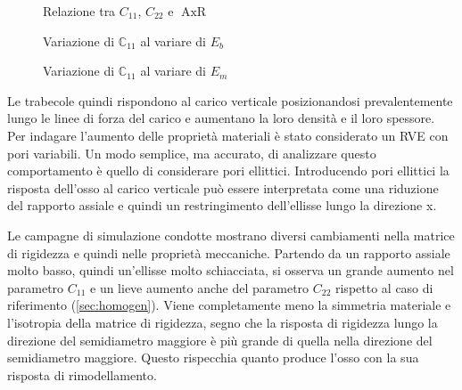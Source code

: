 \documentclass[a4paper,num-refs]{oup-contemporary}
\begin{document}
\label{sec:variazione_simmetria}

\begin{figure}[bt!] %

	\centering
	\def\svgwidth{0.9\linewidth}
	
	\caption{Relazione tra $C_{11}$, $C_{22}$ e $\operatorname{AxR}$ }
	\label{fig:geometric_variation}
\end{figure}




\begin{figure}[bt!] %
	\centering
	\def\svgwidth{0.9\linewidth}
	
	\caption{Variazione di $\mathbb C_{11}$ al variare di $E_b$}\label{fig:var_Ebone}
\end{figure}

\begin{figure}[bt!] %
	\centering
	\def\svgwidth{0.9\linewidth}
	
	\caption{Variazione di $\mathbb C_{11}$ al variare di $E_m$}\label{fig:var_Emarrow}
\end{figure}



Le trabecole quindi rispondono al carico verticale posizionandosi prevalentemente lungo le linee di forza del carico e aumentano la loro densità e il loro spessore. Per indagare l'aumento delle proprietà materiali è stato considerato un RVE con pori variabili. Un modo semplice, ma accurato, di analizzare questo comportamento è quello di considerare pori ellittici. Introducendo pori ellittici la risposta dell'osso al carico verticale può essere interpretata come una riduzione del rapporto assiale e quindi un restringimento dell'ellisse lungo la direzione x. 

Le campagne di simulazione condotte mostrano diversi cambiamenti nella matrice di rigidezza e quindi nelle proprietà meccaniche. Partendo da un rapporto assiale molto basso, quindi un'ellisse molto schiacciata, si osserva un grande aumento nel parametro $C_{11}$ e un lieve aumento anche del parametro $C_{22}$ rispetto al caso di riferimento (\cref{sec:homogen}). Viene completamente meno la simmetria materiale e l'isotropia della matrice di rigidezza, segno che la risposta di rigidezza lungo la direzione del semidiametro maggiore è più grande di quella nella direzione del semidiametro maggiore. Questo rispecchia quanto produce l'osso con la sua risposta di rimodellamento. 
\end{document}
